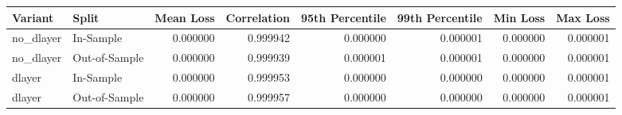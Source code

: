 \begin{tabular}{llrrrrrr}
\toprule
Variant & Split & Mean Loss & Correlation & 95th Percentile & 99th Percentile & Min Loss & Max Loss \\
\midrule
no_dlayer & In-Sample & 0.000000 & 0.999942 & 0.000000 & 0.000001 & 0.000000 & 0.000001 \\
no_dlayer & Out-of-Sample & 0.000000 & 0.999939 & 0.000001 & 0.000001 & 0.000000 & 0.000001 \\
dlayer & In-Sample & 0.000000 & 0.999953 & 0.000000 & 0.000000 & 0.000000 & 0.000001 \\
dlayer & Out-of-Sample & 0.000000 & 0.999957 & 0.000000 & 0.000000 & 0.000000 & 0.000001 \\
\bottomrule
\end{tabular}

